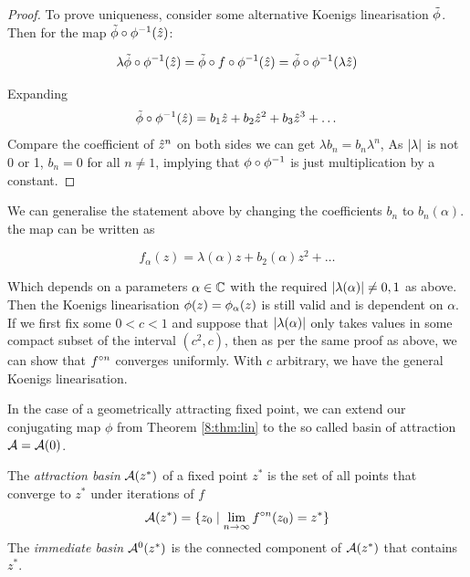 \documentclass[../main.tex]{subfiles}
\begin{document}
\begin{proof}
    To prove uniqueness, consider some alternative Koenigs linearisation $\tilde{\phi}$. Then for the map $\tilde{\phi} \circ \phi^{-1}(\hat{z})$:
    
    \begin{equation*}
        \lambda \tilde{\phi} \circ \phi^{-1}(\hat{z})=\tilde{\phi} \circ f \circ \phi^{-1} (\hat{z})=\tilde{\phi} \circ \phi^{-1} (\lambda \hat{z})
    \end{equation*}
    
    Expanding
    \begin{equation*}
        \tilde{\phi} \circ \phi^{-1}(\hat{z})=b_{1} \hat{z}+b_{2} \hat{z}^{2}+b_{3} \hat{z}^{3}+\dots
    \end{equation*}
    Compare the coefficient of $\hat{z}^n$ on both sides we can get $\lambda b_{n}=b_{n} \lambda^{n}$, As $\left|\lambda\right|$ is not 0 or 1, $b_n=0$ for all $n\neq1$, implying that $\phi\circ \phi^{-1}$ is just multiplication by a constant.
\end{proof}

\begin{rmk}
    \label{8:rmk:genlin}
    We can generalise the statement above by changing the coefficients $b_n$ to $b_n(\alpha)$. the map can be written as
    
    \begin{equation*}
        f_{\alpha}(z)=\lambda(\alpha) z+b_{2}(\alpha) z^{2}+\dots
    \end{equation*}
    
    Which depends on a parameters $\alpha\in \mathbb{C}$ with the required  $\left|\lambda(\alpha)\right| \neq 0,1 $ as above. Then the Koenigs linearisation $\phi(z)=\phi_{\alpha}(z)$ is still valid and is dependent on $\alpha$. If we first fix some $0<c<1$ and suppose that $\left|\lambda(\alpha)\right|$ only takes values in some compact subset of the interval $\left(c^{2}, c\right)$, then as per the same proof as above, we can show that $f^{\circ n}$ converges uniformly. With $c$ arbitrary, we have the general Koenigs linearisation.
\end{rmk}

In the case of a geometrically attracting fixed point, we can extend our conjugating map $\phi$ from Theorem \eqref{8:thm:lin} to the so called basin of attraction $\mathcal{A} = \mathcal{A}(0)$.

\begin{dfn}
    \label{intro:dfn:basin}
    The \emph{attraction basin} $\mathcal{A}(z^*)$ of a fixed point $z^*$ is the set of all points that converge to $z^*$ under iterations of $f$
    \begin{equation*}
        \mathcal{A}(z^*) = \{z_0\mid \lim_{n \rightarrow \infty} f^{\circ n}(z_0) = z^*\}
    \end{equation*}
    The \emph{immediate basin} $\mathcal{A}^0(z^*)$ is the connected component of $\mathcal{A}(z^*)$ that contains $z^*$.
\end{dfn}
\end{document}
